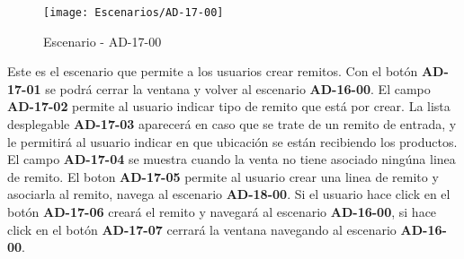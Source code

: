 \begin{figure}[H]
\centering
\texttt{[image: Escenarios/AD-17-00]}
\caption{Escenario - AD-17-00}
\label{fig:AD-17-00}
\end{figure}
Este es el escenario que permite a los usuarios crear remitos. Con el botón \textbf{AD-17-01} se podrá cerrar la ventana y volver al escenario \textbf{AD-16-00}.
El campo \textbf{AD-17-02} permite al usuario indicar tipo de remito que está por crear.  La lista desplegable \textbf{AD-17-03} aparecerá en caso que se trate de un remito de entrada, y le permitirá al usuario indicar en que ubicación se están recibiendo los productos.
El campo \textbf{AD-17-04} se muestra cuando la venta no tiene asociado ningúna linea de remito. El boton \textbf{AD-17-05} permite al usuario crear una linea de remito y asociarla al remito, navega al escenario \textbf{AD-18-00}. Si el usuario hace click en el botón \textbf{AD-17-06} creará el remito y navegará al escenario \textbf{AD-16-00}, si hace click en el botón \textbf{AD-17-07} cerrará la ventana navegando al escenario \textbf{AD-16-00}.
\clearpage
